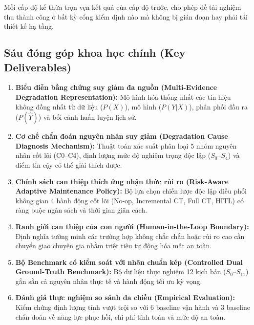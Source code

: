 Mỗi cấp độ kế thừa trọn vẹn kết quả của cấp độ trước, cho phép đề tài nghiệm thu thành công ở bất kỳ cổng kiểm định nào mà không bị gián đoạn hay phải tái thiết kế hạ tầng.

\subsection{Sáu đóng góp khoa học chính (Key Deliverables)}
\begin{enumerate}
  \item \textbf{Biểu diễn bằng chứng suy giảm đa nguồn (Multi-Evidence Degradation Representation):} Mô hình hóa thống nhất các tín hiệu không đồng nhất từ dữ liệu ($P(X)$), mô hình ($P(Y|X)$), phân phối đầu ra ($P(\hat{Y})$) và bối cảnh huấn luyện lịch sử.
  \item \textbf{Cơ chế chẩn đoán nguyên nhân suy giảm (Degradation Cause Diagnosis Mechanism):} Thuật toán xác suất phân loại 5 nhóm nguyên nhân cốt lõi (C0--C4), định lượng mức độ nghiêm trọng độc lập ($S_0$--$S_4$) và điểm tin cậy có thể giải thích được.
  \item \textbf{Chính sách can thiệp thích ứng nhận thức rủi ro (Risk-Aware Adaptive Maintenance Policy):} Bộ lựa chọn chiến lược độc lập điều phối không gian 4 hành động cốt lõi (No-op, Incremental CT, Full CT, HITL) có ràng buộc ngân sách và thời gian giãn cách.
  \item \textbf{Ranh giới can thiệp của con người (Human-in-the-Loop Boundary):} Định nghĩa tường minh các trường hợp không chắc chắn hoặc rủi ro cao cần chuyển giao chuyên gia nhằm triệt tiêu tự động hóa mất an toàn.
  \item \textbf{Bộ Benchmark có kiểm soát với nhãn chuẩn kép (Controlled Dual Ground-Truth Benchmark):} Bộ dữ liệu thực nghiệm 12 kịch bản ($S_0$--$S_{11}$) gắn sẵn cả nguyên nhân thực tế và hành động tối ưu kỳ vọng.
  \item \textbf{Đánh giá thực nghiệm so sánh đa chiều (Empirical Evaluation):} Kiểm chứng định lượng tính vượt trội so với 6 baseline vận hành và 3 baseline chẩn đoán về năng lực phục hồi, chi phí tính toán và mức độ an toàn.
\end{enumerate}
